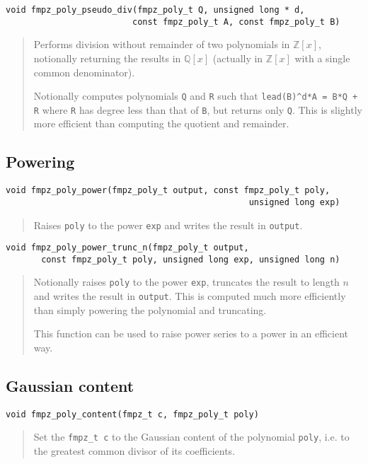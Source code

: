 \documentclass[a4paper,10pt]{article}
\newcommand{\Z}{\mathbb{Z}}
\newcommand{\Q}{\mathbb{Q}}
\newcommand{\code}{\lstinline}
\begin{document}
\begin{lstlisting}
void fmpz_poly_pseudo_div(fmpz_poly_t Q, unsigned long * d, 
                         const fmpz_poly_t A, const fmpz_poly_t B)
\end{lstlisting}
\begin{quote}
Performs division without remainder of two polynomials in $\Z[x]$, notionally returning the results in $\Q[x]$ (actually in $\Z[x]$ with a single common denominator).

Notionally computes polynomials \code{Q} and \code{R} such that \code{lead(B)^d*A = B*Q + R} where \code{R} has degree less than that of \code{B}, but returns only \code{Q}. This is slightly more efficient than computing the quotient and remainder.
\end{quote}

\subsection{Powering}

\begin{lstlisting}
void fmpz_poly_power(fmpz_poly_t output, const fmpz_poly_t poly, 
                                                unsigned long exp) 
\end{lstlisting}
\begin{quote}
Raises \code{poly} to the power \code{exp} and writes the result in \code{output}.
\end{quote}

\begin{lstlisting}
void fmpz_poly_power_trunc_n(fmpz_poly_t output, 
       const fmpz_poly_t poly, unsigned long exp, unsigned long n) 
\end{lstlisting}
\begin{quote}
Notionally raises \code{poly} to the power \code{exp}, truncates the result to length $n$ and writes the result in \code{output}. This is computed much more efficiently than simply powering the polynomial and truncating.

This function can be used to raise power series to a power in an efficient way.
\end{quote}

\subsection{Gaussian content}

\begin{lstlisting}
void fmpz_poly_content(fmpz_t c, fmpz_poly_t poly)
\end{lstlisting}
\begin{quote}
Set the \code{fmpz_t c} to the Gaussian content of the polynomial \code{poly}, i.e. to the greatest common divisor of its coefficients.
\end{quote}
\end{document}
